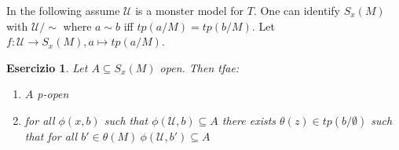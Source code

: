 \documentclass{article}
\newtheorem{exercise}{Esercizio}
\begin{document}
In the following assume $\mathcal{U}$ is a monster model for $T$. One can identify $S_x(M)$ with $\mathcal{U}/\sim$ where $a \sim b$ iff $tp(a/M) = tp(b/M)$.
Let $f: \mathcal{U} \to S_x(M), a \mapsto tp(a/M)$.

\begin{exercise}

	Let $A \subseteq S_x(M)$ open. Then tfae:
	\begin{enumerate}
		\item	$A$ p-open
		\item	for all $\phi(x,b)$ such that $\phi(\mathcal{U},b) \subseteq A$ there exists $\theta(z) \in tp(b/\emptyset)$ such that
			for all $b' \in \theta(M) \ \phi(\mathcal{U},b') \subseteq A$ 
	\end{enumerate}

\end{exercise}
\end{document}
